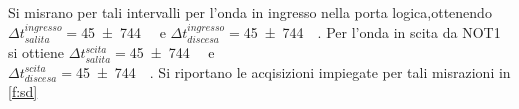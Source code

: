 	Si misrano per tali intervalli per l'onda in ingresso nella porta logica,ottenendo $\Delta t_{salita}^{ingresso}=$\SI{45 \pm 744}{\nano \sec}
	e
	$\Delta t_{discesa}^{ingresso}=$\SI{45 \pm 744}{\nano \sec}.
	Per l'onda in scita da NOT1 si ottiene
	$\Delta t_{salita}^{scita}=$\SI{45 \pm 744}{\nano \sec}
	e\\
	$\Delta t_{discesa}^{scita}=$\SI{45 \pm 744}{\nano \sec}.
	Si riportano le acqisizioni impiegate per tali misrazioni in \figurename{ \ref{f:sd} }
	\begin{figure}[hb]
		\centering
		\\
\end{figure}

